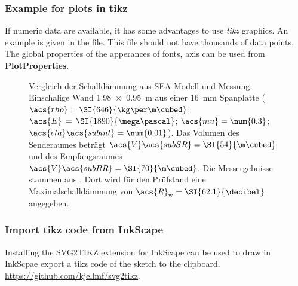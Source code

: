  \subsubsection{Example for plots in tikz}
 If numeric data are available, it has some advantages to use \emph{tikz} graphics. An example is given in the file. 
 This file should not have thousands of data points.
 The global properties of the apperances of fonts, axis can be used from \textbf{PlotProperties}.
 \begin{figure}[htb]
 	\raggedright
 	\hspace{\LeftHspace}
 	
 	\caption[Kurztitel]{Vergleich der Schalldämmung aus SEA-Modell und Messung. Einschalige Wand \SI{1.98 x 0.95}{\m} aus einer \SI{16}{\milli\m} Spanplatte ($\acs{rho}=\SI{646}{\kg\per\m\cubed}$; $\acs{E}\,=\,\SI{1890}{\mega\pascal}$;  $\acs{mu}=\num{0.3} $; $\acs{eta}\acs{subint}=\num{0.01}$). Das Volumen des Senderaumes beträgt $\acs{V}\acs{subSR}=\SI{54}{\m\cubed}$ und des Empfangsraumes $\acs{V}\acs{subRR}=\SI{70}{\m\cubed}$.  Die Messergebnisse stammen aus \parencite[222]{Nusser.2007}. Dort wird für den Prüfstand eine Maximalschalldämmung von $\acs{R}_{\textrm{w}}=\SI{62.1}{\decibel}$ angegeben.} 
 	\label{fig:CB16mmTL}
 \end{figure}
 \subsubsection{Import tikz code from InkScape}
 Installing the SVG2TIKZ extension for InkScape can be used to draw in InkScpae export a tikz code of the sketch to the clipboard.
 \url{https://github.com/kjellmf/svg2tikz}.

